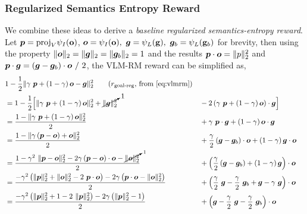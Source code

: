 \subsubsection{Regularized Semantics Entropy Reward}
\label{sec:entropy-reward-reg}
We combine these ideas to derive a \emph{baseline regularized semantics-entropy reward}.
Let \(\bm{p} = \text{proj}_{V}\psi_I(\mathbf{o})\), \(\bm{o} = \psi_I(\mathbf{o}),\ \bm{g} = \psi_L(\mathbf{g}),\ \bm{g}_b = \psi_L(\mathbf{g}_b)\) for brevity, then using the property \(\lVert\bm{o}\rVert_2 = \lVert\bm{g}\rVert_2 = \lVert\bm{g}_b\rVert_2 = 1\) and the results \(\bm{p} \cdot \bm{o} = \lVert p\rVert^2_2\) and \(\bm{p} \cdot \bm{g} = (\bm{g} - \bm{g}_b) \cdot \bm{o}\ /\ 2\), the VLM-RM reward can be simplified as,
\vspace{-1.5pt}
\begin{align}
    &1 - \dfrac{1}{2} \norm{\gamma\ \bmp + \left(1 - \gamma\right) \bmo - \bmg}^2_2 \tag{\(r_{\text{goal-reg}}\), from \ref{eq:vlmrm}}\\
    \label{eq:vlmrm-equivalence-start}
    &= 1 - \dfrac{1}{2} \Big[\norm{\gamma\ \bmp + \left(1 - \gamma\right) \bmo}^2_2 + \cancelto{1}{\norm{\bmg}^2_2} &&- 2 \left(\gamma\ \bmp + \left(1 - \gamma\right) \bmo\right) \cdot \bmg\Big]\\
    &= \dfrac{1 - \norm{\gamma\ \bmp + \left(1 - \gamma\right) \bmo}^2_2}{2} &&+ \gamma\ \bmp \cdot \bmg + \left(1 - \gamma\right) \bmo \cdot \bmg\\
    &= \dfrac{1 - \norm{\gamma \left(\bmp - \bmo\right) + \bmo}^2_2}{2} &&+ \dfrac{\gamma}{2} \left(\bmg - \bmg_b\right) \cdot \bmo + \left(1 - \gamma\right) \bmg \cdot \bmo\\
    &= \dfrac{1 - \gamma^2\ \norm{\bmp - \bmo}^2_2 - 2 \gamma \left(\bmp - \bmo\right) \cdot \bmo - \cancelto{1}{\norm{\bmo}^2_2}}{2} &&+ \left(\dfrac{\gamma}{2} \left(\bmg - \bmg_b\right) + \left(1 - \gamma\right) \bmg\right) \cdot \bmo\\
    &= \dfrac{-\gamma^2 \left(\norm{\bmp}^2_2 + \norm{\bmo}^2_2 - 2\ \bmp \cdot \bmo\right) - 2 \gamma \left(\bmp \cdot \bmo - \norm{\bmo}^2_2\right)}{2} &&+ \left(\dfrac{\gamma}{2}\ \bmg - \dfrac{\gamma}{2}\ \bmg_b + \bmg - \gamma\ \bmg\right) \cdot \bmo\\
    &= \dfrac{-\gamma^2 \left(\norm{\bmp}^2_2 + 1 - 2\ \norm{\bmp}^2_2\right) - 2 \gamma \left(\norm{\bmp}^2_2 - 1\right)}{2} &&+ \left(\bmg - \dfrac{\gamma}{2}\ \bmg - \dfrac{\gamma}{2}\ \bmg_b\right) \cdot \bmo\\

\end{align}

